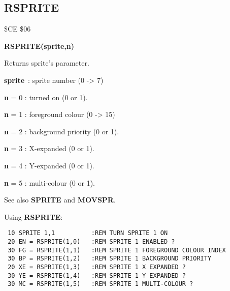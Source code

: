 
\newpage
\subsection{RSPRITE}
\begin{description}[leftmargin=2cm,style=nextline]
\item [Token:] \$CE \$06
\item [Format:] {\bf RSPRITE(sprite,n)}
\item [Usage:]  Returns sprite's parameter.

                {\bf sprite} : sprite number (0 -> 7)

                {\bf n} = 0 : turned on (0 or 1).

                {\bf n} = 1 : foreground colour (0 -> 15)

                {\bf n} = 2 : background priority (0 or 1).

                {\bf n} = 3 : X-expanded (0 or 1).

                {\bf n} = 4 : Y-expanded (0 or 1).

                {\bf n} = 5 : multi-colour (0 or 1).

\item [Remarks:] See also {\bf SPRITE} and {\bf MOVSPR}.

\item [Example:] Using {\bf RSPRITE}:
\begin{tcolorbox}[colback=black,coltext=white]
\verbatimfont{\codefont}
\begin{verbatim}
 10 SPRITE 1,1          :REM TURN SPRITE 1 ON
 20 EN = RSPRITE(1,0)   :REM SPRITE 1 ENABLED ?
 30 FG = RSPRITE(1,1)   :REM SPRITE 1 FOREGROUND COLOUR INDEX
 30 BP = RSPRITE(1,2)   :REM SPRITE 1 BACKGROUND PRIORITY
 20 XE = RSPRITE(1,3)   :REM SPRITE 1 X EXPANDED ?
 30 YE = RSPRITE(1,4)   :REM SPRITE 1 Y EXPANDED ?
 30 MC = RSPRITE(1,5)   :REM SPRITE 1 MULTI-COLOUR ?
\end{verbatim}
\end{tcolorbox}
\end{description}




\newpage
